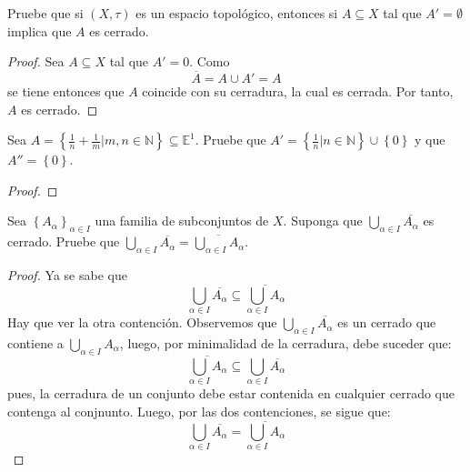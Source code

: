 \documentclass[12pt]{report}
\theoremstyle{largebreak}
\newcommand{\Cls}[1]{\ensuremath{\overline{#1}}}
\begin{document}
    \begin{excer}
        Pruebe que si $(X,\tau)$ es un espacio topológico, entonces si $A\subseteq X$ tal que $A'=\emptyset$ implica que $A$ es cerrado.
    \end{excer}

    \begin{proof}
        Sea $A\subseteq X$ tal que $A'=0$. Como
        \begin{equation*}
            \Cls{A}=A\cup A'=A
        \end{equation*}
        se tiene entonces que $A$ coincide con su cerradura, la cual es cerrada. Por tanto, $A$ es cerrado.
    \end{proof}

    \begin{excer}
        Sea $A=\left\{\frac{1}{n}+\frac{1}{m}\Big|m,n\in\mathbb{N} \right\}\subseteq\mathbb{E}^1$. Pruebe que $A'=\left\{\frac{1}{n}\Big|n\in\mathbb{N} \right\}\cup\left\{0\right\}$ y que $A''=\left\{0\right\}$.
    \end{excer}

    \begin{proof}
        
    \end{proof}

    \begin{excer}
        Sea $\left\{A_\alpha \right\}_{\alpha\in I}$ una familia de subconjuntos de $X$. Suponga que $\bigcup_{\alpha\in I}\Cls{A_\alpha}$ es cerrado. Pruebe que $\bigcup_{\alpha\in I}\Cls{A_\alpha}=\Cls{\bigcup_{\alpha\in I}A_\alpha}$.
    \end{excer}

    \begin{proof}
        Ya se sabe que
        \begin{equation*}
            \bigcup_{\alpha\in I}\Cls{A_\alpha}\subseteq\Cls{\bigcup_{\alpha\in I}A_\alpha}
        \end{equation*}
        Hay que ver la otra contención. Observemos que $\bigcup_{\alpha\in I}\Cls{A_\alpha}$ es un cerrado que contiene a $\bigcup_{\alpha\in I}A_\alpha$, luego, por minimalidad de la cerradura, debe suceder que:
        \begin{equation*}
            \Cls{\bigcup_{\alpha\in I}A_\alpha}\subseteq\bigcup_{\alpha\in I}\Cls{A_\alpha}
        \end{equation*}
        pues, la cerradura de un conjunto debe estar contenida en cualquier cerrado que contenga al conjnunto. Luego, por las dos contenciones, se sigue que:
        \begin{equation*}
            \bigcup_{\alpha\in I}\Cls{A_\alpha}=\Cls{\bigcup_{\alpha\in I}A_\alpha}
        \end{equation*}
    \end{proof}
\end{document}
